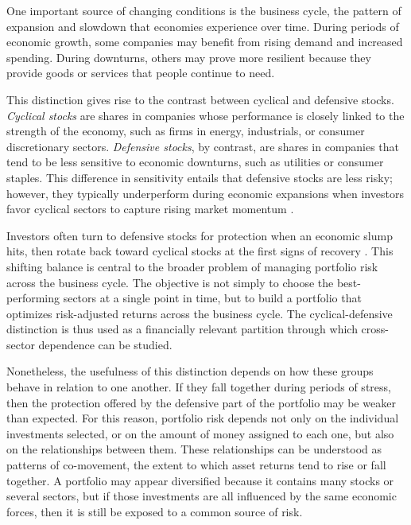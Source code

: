 \documentclass[12pt]{report} %
\begin{document}
One important source of changing conditions is the business cycle, the pattern of expansion 
and slowdown that economies experience over time. During periods of economic growth, some 
companies may benefit from rising demand and increased spending. During downturns, others 
may prove more resilient because they provide goods or services that people continue to 
need.

This distinction gives rise to the contrast between cyclical and defensive stocks. 
\textit{Cyclical stocks} are shares in companies whose performance is closely linked to 
the strength of the economy, such as firms in energy, industrials, or consumer 
discretionary sectors. \textit{Defensive stocks}, by contrast, are shares in companies 
that tend to be less sensitive to economic downturns, such as utilities or consumer staples. 
This difference in sensitivity entails that defensive stocks are less risky; however, 
they typically underperform during economic expansions when investors favor cyclical 
sectors to capture rising market momentum \citep{deLongisZaninEllis2022}.

Investors often turn to defensive stocks for protection when an economic slump hits, then 
rotate back toward cyclical stocks at the first signs of recovery 
\citep{StanglJacobsenVisaltanachoti2007}. This shifting balance is 
central to the broader problem of managing portfolio risk across the business cycle. The 
objective is not simply to choose the best-performing sectors at a single point in time, 
but to build a portfolio that optimizes risk-adjusted returns across the business cycle. 
The cyclical-defensive distinction is thus used as a financially relevant partition 
through which cross-sector dependence can be studied.

Nonetheless, the usefulness of this distinction 
depends on how these groups behave in relation to one another. If they fall together 
during periods of stress, then the protection offered by the defensive part of the 
portfolio may be weaker than expected. For this reason, portfolio risk depends not only 
on the individual investments selected, or on the amount of money assigned to each one, 
but also on the relationships between them. These relationships can be understood as 
patterns of co-movement, the extent to which asset returns 
tend to rise or fall together. 
A portfolio may appear diversified because it contains many stocks or several sectors, 
but if those investments are all influenced by the same economic forces, 
then it is still be exposed to a common source of risk. 
\end{document}
